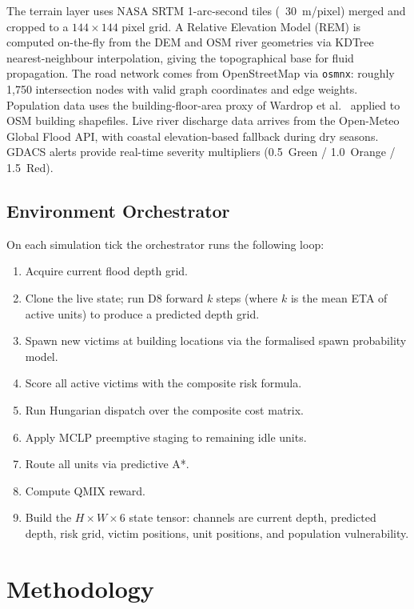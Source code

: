 \documentclass[conference]{IEEEtran}
\begin{document}
The terrain layer uses NASA SRTM 1-arc-second tiles (~30~m/pixel) merged and
cropped to a $144 \times 144$ pixel grid.
A Relative Elevation Model (REM) is computed on-the-fly from the DEM and
OSM river geometries via KDTree nearest-neighbour interpolation, giving the
topographical base for fluid propagation.
The road network comes from OpenStreetMap via \texttt{osmnx}: roughly 1,750
intersection nodes with valid graph coordinates and edge weights.
Population data uses the building-floor-area proxy of Wardrop et
al.~\cite{wardrop2018population} applied to OSM building shapefiles.
Live river discharge data arrives from the Open-Meteo Global Flood API,
with coastal elevation-based fallback during dry seasons.
GDACS alerts provide real-time severity multipliers (0.5~Green / 1.0~Orange /
1.5~Red).

\subsection{Environment Orchestrator}

On each simulation tick the orchestrator runs the following loop:
\begin{enumerate}
  \item Acquire current flood depth grid.
  \item Clone the live state; run D8 forward $k$ steps (where $k$ is the mean
    ETA of active units) to produce a predicted depth grid.
  \item Spawn new victims at building locations via the formalised spawn
    probability model.
  \item Score all active victims with the composite risk formula.
  \item Run Hungarian dispatch over the composite cost matrix.
  \item Apply MCLP preemptive staging to remaining idle units.
  \item Route all units via predictive A*.
  \item Compute QMIX reward.
  \item Build the $H \times W \times 6$ state tensor:
    channels are current depth, predicted depth, risk grid, victim positions,
    unit positions, and population vulnerability.
\end{enumerate}

\section{Methodology}
\label{sec:method}
\end{document}
